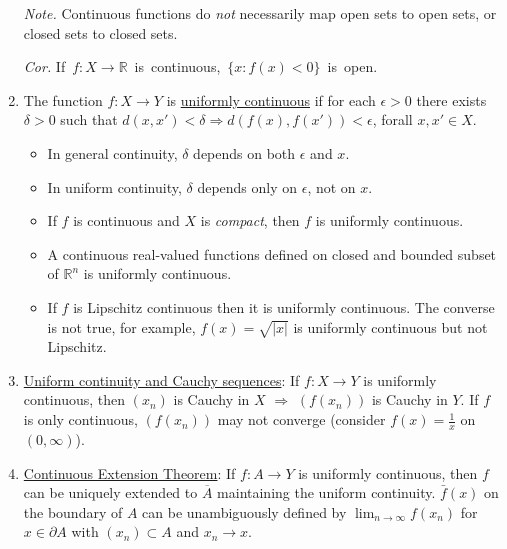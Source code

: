 \documentclass[%
 aip,
 jmp,%
 amsmath,amssymb,
 reprint,%
]{revtex4-1}
\def\R{{\mathbb R}}
\def\d{\delta}
\def\e{\epsilon}
\newcommand{\imply}{\Rightarrow}
\newcommand{\defn}[1]{\underline{#1}}
\begin{document}
\begin{enumerate}
      \emph{Note.} Continuous functions do \emph{not} necessarily
      map open sets to open sets, or closed sets to closed sets.

      \emph{Cor.} \mbox{If $f: X\to\R$ is continuous, $\{x: f(x)<0\}$ is open.}

   \item The function $f: X \to Y$ is \defn{uniformly continuous} if for each
     $\e > 0$ there exists $\d > 0$ such that $d(x, x') < \d \imply d(f(x), f(x')) < \e$,
     forall $x,x' \in X$.
          \begin{itemize}
            \item In general continuity, $\d$ depends on both $\e$ and $x$.
            \item In uniform continuity, $\d$ depends only on $\e$, not on $x$.
            \item If $f$ is continuous and $X$ is \emph{compact}, then $f$ is uniformly continuous.
            \item A continuous real-valued functions defined on closed and bounded subset of $\R^n$ is uniformly continuous.
            \item If $f$ is Lipschitz continuous then it is uniformly continuous.
            {\footnotesize\color{gray} The converse is not true, for example,
            $f(x) = \sqrt{|x|}$ is uniformly continuous but not Lipschitz. }
          \end{itemize}

    \item \defn{Uniform continuity and Cauchy sequences}: If $f: X\to Y$ is uniformly continuous,
       then $(x_n)$ is Cauchy in $X$ $\imply$ $(f(x_n))$ is Cauchy in $Y$.
       {\footnotesize\color{gray} If $f$ is only continuous, $(f(x_n))$ may
        not converge (consider $f(x) = \frac{1}{x}$ on $(0, \infty)$).}

    \item \defn{Continuous Extension Theorem}: If $f: A \to Y$ is uniformly continuous,
    then $f$ can be uniquely extended to $\overline{A}$ maintaining the uniform continuity.
    {\footnotesize\color{gray} $\bar{f}(x)$ on the boundary of $A$ can be unambiguously
    defined by $\lim_{n\to\infty} f(x_n)$ for $x\in\partial A$ with $(x_n)\subset A$ and
    $x_n\to x$.}
\end{enumerate}
\end{document}
